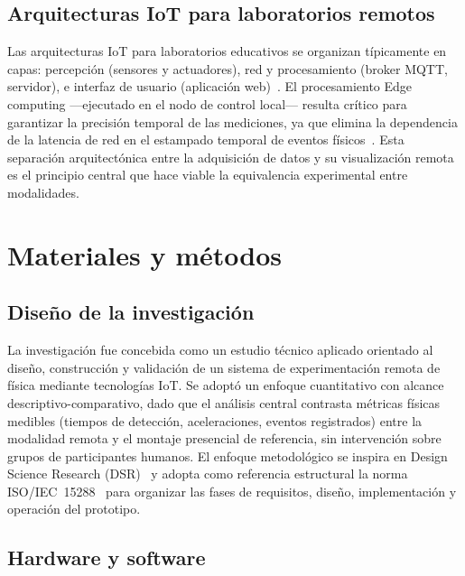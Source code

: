 \documentclass{espol-rte}
\begin{document}
\subsection{Arquitecturas IoT para laboratorios remotos}

Las arquitecturas IoT para laboratorios educativos se organizan t\'ipicamente en capas: percepci\'on (sensores y actuadores), red y procesamiento (broker MQTT, servidor), e interfaz de usuario (aplicaci\'on web)~\parencite{r7,r48}. El procesamiento Edge computing ---ejecutado en el nodo de control local--- resulta cr\'itico para garantizar la precisi\'on temporal de las mediciones, ya que elimina la dependencia de la latencia de red en el estampado temporal de eventos f\'isicos~\parencite{r12}. Esta separaci\'on arquitect\'onica entre la adquisici\'on de datos y su visualizaci\'on remota es el principio central que hace viable la equivalencia experimental entre modalidades.

\section{Materiales y m\'etodos}

\subsection{Dise\~no de la investigaci\'on}

La investigaci\'on fue concebida como un estudio t\'ecnico aplicado orientado al dise\~no, construcci\'on y validaci\'on de un sistema de experimentaci\'on remota de f\'isica mediante tecnolog\'ias IoT. Se adopt\'o un enfoque cuantitativo con alcance descriptivo-comparativo, dado que el an\'alisis central contrasta m\'etricas f\'isicas medibles (tiempos de detecci\'on, aceleraciones, eventos registrados) entre la modalidad remota y el montaje presencial de referencia, sin intervenci\'on sobre grupos de participantes humanos. El enfoque metodol\'ogico se inspira en Design Science Research (DSR)~\parencite{r16} y adopta como referencia estructural la norma ISO/IEC~15288~\parencite{r17} para organizar las fases de requisitos, dise\~no, implementaci\'on y operaci\'on del prototipo.

\subsection{Hardware y software}
\end{document}
